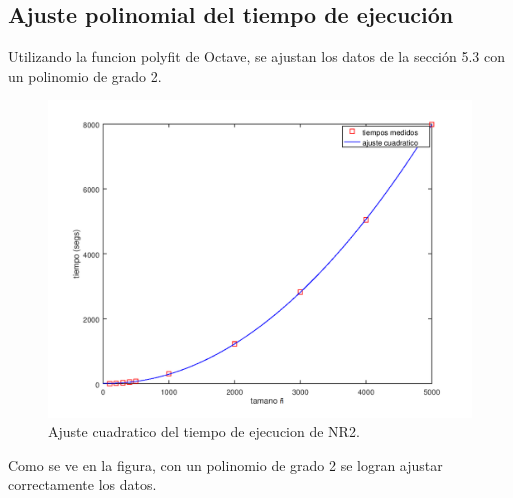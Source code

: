 \subsection{Ajuste polinomial del tiempo de ejecución}
Utilizando la funcion polyfit de Octave, se ajustan los datos de la sección 5.3 con un polinomio de grado 2.
\begin{figure}[h!]
    \includegraphics[width=\linewidth]{Grafica_5_4.png}
    \caption{Ajuste cuadratico del tiempo de ejecucion de NR2.}
    \label{fig:Grafica_5_4}
\end{figure}
Como se ve en la figura, con un polinomio de grado 2 se logran ajustar correctamente los datos.
